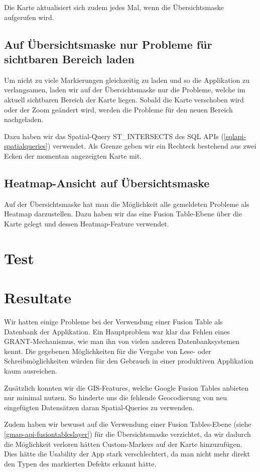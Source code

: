 Die Karte aktualisiert sich zudem jedes Mal, wenn die Übersichtsmaske aufgerufen wird.

\subsection{Auf Übersichtsmaske nur Probleme für sichtbaren Bereich laden}
Um nicht zu viele Markierungen gleichzeitig zu laden und so die Applikation zu verlangsamen, laden wir auf der Übersichtsmaske nur die Probleme, welche im aktuell sichtbaren Bereich der Karte liegen. Sobald die Karte verschoben wird oder der Zoom geändert wird, werden die Probleme für den neuen Bereich nachgeladen.

Dazu haben wir das Spatial-Query ST\_INTERSECTS des SQL APIs (\ref{sqlapi-spatialqueries}) verwendet. Als Grenze geben wir ein Rechteck bestehend aus zwei Ecken der momentan angezeigten Karte mit.

\subsection{Heatmap-Ansicht auf Übersichtsmaske}
Auf der Übersichtsmaske hat man die Möglichkeit alle gemeldeten Probleme als Heatmap darzustellen. Dazu haben wir das eine Fusion Table-Ebene über die Karte gelegt und dessen Heatmap-Feature verwendet. 

\section{Test}

\section{Resultate}
Wir hatten einige Probleme bei der Verwendung einer Fusion Table als Datenbank der Applikation. Ein Hauptproblem war klar das Fehlen eines GRANT-Mechanismus, wie man ihn von vielen anderen Datenbanksystemen kennt. Die gegebenen Möglichkeiten für die Vergabe von Lese- oder Schreibmöglichkeiten würden für den Gebrauch in einer produktiven Applikation kaum ausreichen.

Zusätzlich konnten wir die GIS-Features, welche Google Fusion Tables anbieten nur minimal nutzen. So hinderte uns die fehlende  Geocodierung von neu eingefügten Datensätzen  daran Spatial-Queries zu verwenden.

Zudem haben wir bewusst auf die Verwendung einer Fusion Tables-Ebene (siehe \ref{gmap-api-fusiontableslayer}) für die Übersichtsmaske verzichtet, da wir dadurch die Möglichkeit verloren hätten Custom-Markers auf der Karte hinzuzufügen. Dies hätte die Usability der App stark verschlechtert, da man nicht mehr direkt den Typen des markierten Defekts erkannt hätte.

